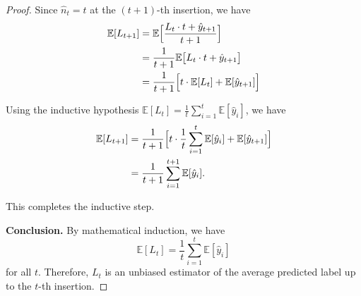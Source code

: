 \begin{proof}
Since \(\hat{n}_t = t\) at the \((t+1)\)-th insertion, we have
\begin{align*}
\mathbb{E}[L_{t+1}]
    &= \mathbb{E}\Bigl[\frac{L_t \cdot t + \hat{y}_{t+1}}{t + 1} \Bigr]\\
    &= \frac{1}{t+1} \mathbb{E}\bigl[L_t \cdot t + \hat{y}_{t+1} \bigr]\\
    &= \frac{1}{t+1} \Bigl[t \cdot \mathbb{E}[L_t] + \mathbb{E}[\hat{y}_{t+1}] \Bigr]
\end{align*}

Using the inductive hypothesis
\(\mathbb{E}[L_t] = \frac{1}{t}\sum_{i=1}^t \mathbb{E}[\hat{y}_i]\),
we have
\begin{align*}
\mathbb{E}[L_{t+1}]
    &= \frac{1}{t+1}\Bigl[t \cdot \frac{1}{t}\sum_{i=1}^t \mathbb{E}[\hat{y}_i] + \mathbb{E}[\hat{y}_{t+1}]\Bigr]\\
    &= \frac{1}{t+1} \sum_{i=1}^{t+1} \mathbb{E}[\hat{y}_i].
\end{align*}

This completes the inductive step.


\textbf{Conclusion.}
By mathematical induction, we have
\[
\mathbb{E}[L_t] = \frac{1}{t}\sum_{i=1}^t \mathbb{E}[\hat{y}_i]
\]
for all \(t\). Therefore, \(L_t\) is an unbiased estimator of the average predicted label up to the \(t\)-th insertion.
\end{proof}
